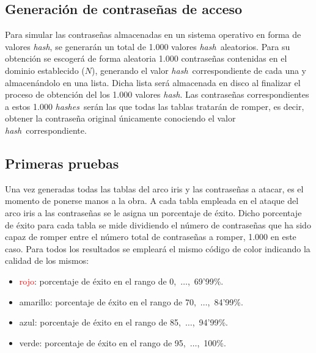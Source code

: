 \documentclass[12pt,spanish,listoffigures,listoftables]{tfgetsinf}
\newcommand{\hash}{\textit{hash}}
\newcommand{\hashes}{\textit{hashes}}
\begin{document}
\subsection{Generación de contraseñas de acceso} \label{contraseñas}

Para simular las contraseñas almacenadas en un sistema operativo en forma de valores \hash, se generarán un total de 1.000 valores \hash~aleatorios. Para su obtención se escogerá de forma aleatoria 1.000 contraseñas contenidas en el dominio establecido ($N$), generando el valor \hash~correspondiente de cada una y almacenándolo en una lista. Dicha lista será almacenada en disco al finalizar el proceso de obtención del los 1.000 valores \hash. Las contraseñas correspondientes a estos 1.000 \hashes~serán las que todas las tablas tratarán de romper, es decir, obtener la contraseña original únicamente conociendo el valor \hash~correspondiente.

\subsection{Primeras pruebas}\label{primeras pruebas}

Una vez generadas todas las tablas del arco iris y las contraseñas a atacar, es el momento de ponerse manos a la obra. A cada tabla empleada en el ataque del arco iris a las contraseñas se le asigna un porcentaje de éxito. Dicho porcentaje de éxito para cada tabla se mide dividiendo el número de contraseñas que ha sido capaz de romper entre el número total de contraseñas a romper, 1.000 en este caso. Para todos los resultados se empleará el mismo código de color indicando la calidad de los mismos:

\begin{itemize}

    \item \textcolor{red}{rojo}: porcentaje de éxito en el rango de 0,~$\dots$,~69'99\%.
    
    \item \textcolor{y}{amarillo}: porcentaje de éxito en el rango de 70,~$\dots$,~84'99\%.
    
    \item \textcolor{b}{azul}: porcentaje de éxito en el rango de 85,~$\dots$,~94'99\%.
    
    \item \textcolor{g}{verde}: porcentaje de éxito en el rango de 95,~$\dots$,~100\%.
    
\end{itemize}
\end{document}
